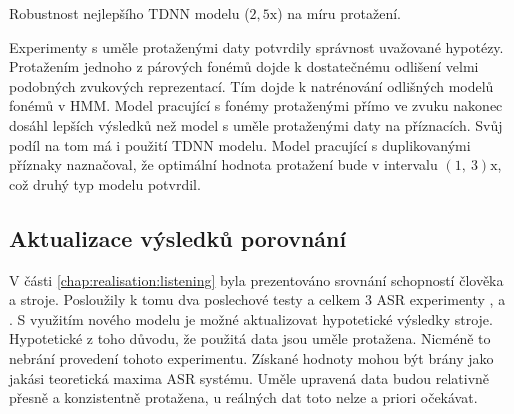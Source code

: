 \begin{table}[htpb]
  \centering
  \def\arraystretch{1.5}
  \caption{Robustnost nejlepšího TDNN modelu ($2,5\mathrm{x}$) na míru protažení.}
  \label{tab:realisation:augmentation:influence:tdnn:robust}
\end{table}

Experimenty s uměle protaženými daty potvrdily správnost uvažované hypotézy.
Protažením jednoho z párových fonémů dojde k dostatečnému odlišení velmi podobných zvukových reprezentací.
Tím dojde k natrénování odlišných modelů fonémů v HMM.
Model pracující s fonémy protaženými přímo ve zvuku nakonec dosáhl lepších výsledků než model s uměle protaženými daty na příznacích.
Svůj podíl na tom má i použití TDNN modelu.
Model pracující s duplikovanými příznaky naznačoval, že optimální hodnota protažení bude v intervalu $\left(1,\ 3\right)\mathrm{x}$, což druhý typ modelu potvrdil.

\subsection{Aktualizace výsledků porovnání}
\label{chap:realisation:augmentation:comparison}

V části \ref{chap:realisation:listening} byla prezentováno srovnání schopností člověka a stroje.
Posloužily k tomu dva poslechové testy a celkem $3$ ASR experimenty ,  a .
S využitím nového modelu je možné aktualizovat hypotetické výsledky stroje.
Hypotetické z toho důvodu, že použitá data jsou uměle protažena.
Nicméně to nebrání provedení tohoto experimentu.
Získané hodnoty mohou být brány jako jakási teoretická maxima ASR systému.
Uměle upravená data budou relativně přesně a konzistentně protažena, u reálných dat toto nelze a priori očekávat.


